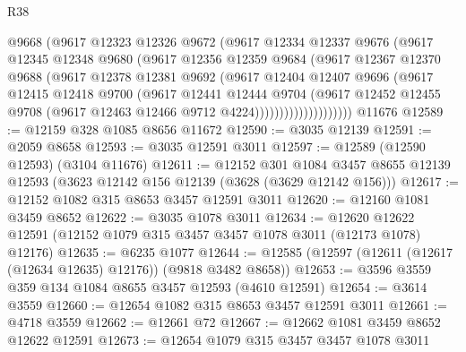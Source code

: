 \begin{lexlean}{R38}
\begin{coremodule}
                      @9668
                      (@9617
                        @12323
                        @12326
                        @9672
                        (@9617
                          @12334
                          @12337
                          @9676
                          (@9617
                            @12345
                            @12348
                            @9680
                            (@9617
                              @12356
                              @12359
                              @9684
                              (@9617
                                @12367
                                @12370
                                @9688
                                (@9617
                                  @12378
                                  @12381
                                  @9692
                                  (@9617
                                    @12404
                                    @12407
                                    @9696
                                    (@9617
                                      @12415
                                      @12418
                                      @9700
                                      (@9617
                                        @12441
                                        @12444
                                        @9704
                                        (@9617
                                          @12452
                                          @12455
                                          @9708
                                          (@9617 @12463 @12466 @9712 @4224))))))))))))))))))))
    @11676
@12589 := @12159 @328 @1085 @8656 @11672
@12590 := @3035 @12139
@12591 := @2059 @8658
@12593 := @3035 @12591 @3011
@12597 := @12589 (@12590 @12593) (@3104 @11676)
@12611 := @12152
    @301
    @1084
    @3457
    @8655
    @12139
    @12593
    (@3623 @12142 @156 @12139 (@3628 (@3629 @12142 @156)))
@12617 := @12152 @1082 @315 @8653 @3457 @12591 @3011
@12620 := @12160 @1081 @3459 @8652
@12622 := @3035 @1078 @3011
@12634 := @12620 @12622 @12591 (@12152 @1079 @315 @3457 @3457 @1078 @3011 (@12173 @1078) @12176)
@12635 := @6235 @1077
@12644 := @12585 (@12597 (@12611 (@12617 (@12634 @12635) @12176)) (@9818 @3482 @8658))
@12653 := @3596 @3559 @359 @134 @1084 @8655 @3457 @12593 (@4610 @12591)
@12654 := @3614 @3559
@12660 := @12654 @1082 @315 @8653 @3457 @12591 @3011
@12661 := @4718 @3559
@12662 := @12661 @72
@12667 := @12662 @1081 @3459 @8652 @12622 @12591
@12673 := @12654 @1079 @315 @3457 @3457 @1078 @3011

\end{coremodule}
\end{lexlean}

